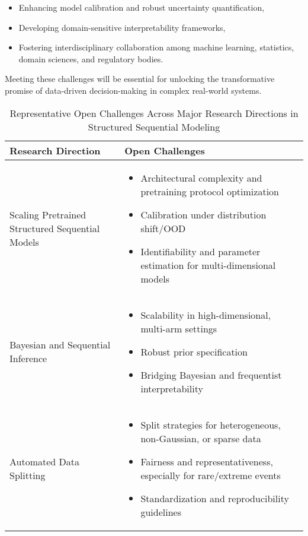 \documentclass[11pt]{article}
\begin{document}
\begin{itemize}
    \item Enhancing model calibration and robust uncertainty quantification,
    \item Developing domain-sensitive interpretability frameworks,
    \item Fostering interdisciplinary collaboration among machine learning, statistics, domain sciences, and regulatory bodies.
\end{itemize}

Meeting these challenges will be essential for unlocking the transformative promise of data-driven decision-making in complex real-world systems.

\begin{table}[htbp]
\centering
\caption{Representative Open Challenges Across Major Research Directions in Structured Sequential Modeling}
\label{tab:open_challenges}
\begin{tabular}{|p{4cm}|p{8.5cm}|}
\hline
\textbf{Research Direction} & \textbf{Open Challenges} \\
\hline
Scaling Pretrained Structured Sequential Models &
\begin{itemize}
    \item Architectural complexity and pretraining protocol optimization 
    \item Calibration under distribution shift/OOD 
    \item Identifiability and parameter estimation for multi-dimensional models
\end{itemize} \\
\hline
Bayesian and Sequential Inference &
\begin{itemize}
    \item Scalability in high-dimensional, multi-arm settings
    \item Robust prior specification
    \item Bridging Bayesian and frequentist interpretability
\end{itemize} \\
\hline
Automated Data Splitting &
\begin{itemize}
    \item Split strategies for heterogeneous, non-Gaussian, or sparse data
    \item Fairness and representativeness, especially for rare/extreme events
    \item Standardization and reproducibility guidelines
\end{itemize} \\

\end{tabular}
\end{table}
\end{document}
